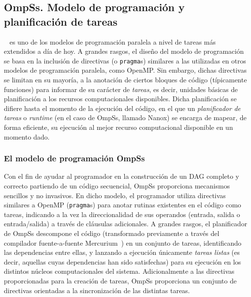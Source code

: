 %
%
%
%

\subsection{OmpSs. Modelo de programación y planificación de tareas}

\ompss~\cite{ompssweb,ompss} es uno de los modelos de programación paralela a nivel de tareas más
extendidos a día de hoy. A grandes rasgos, el diseño del modelo de
programación se basa en la inclusión de directivas (o {\tt pragma}s)
similares a las utilizadas en otros modelos de programación paralela, como
OpenMP. Sin embargo, dichas directivas se limitan en su mayoría, a la
anotación de ciertos bloques de código (típicamente funciones) para
informar de su carácter de {\em tareas}, es decir, unidades básicas de
planificación a los recursos computacionales disponibles. Dicha
planificación se difiere hasta el momento de la ejecución del código, en el
que un {\em planificador de tareas} o {\em runtime} (en el caso de OmpSs,
llamado Nanox) se encarga de mapear, de forma eficiente, su ejecución al
mejor recurso computacional disponible en un momento dado.

\subsubsection{El modelo de programación OmpSs}

Con el fin de ayudar al programador en la construcción de un DAG completo y
correcto partiendo de un código secuencial, OmpSs proporciona mecanismos
sencillos y no invasivos. En dicho modelo, el programador utiliza
directivas similares a OpenMP ({\tt pragma}s) para anotar rutinas
existentes en el código como tareas, indicando a la vez la direccionalidad
de sus operandos (entrada, salida o entrada/salida) a través de cláusulas
adicionales. A grandes rasgos, el planificador de OmpSs descompone el
código (transformado previamente a través del compilador fuente-a-fuente
Mercurium~\cite{Mercurium}) en un conjunto de tareas, identificando las
dependencias entre ellas, y lanzando a ejecución únicamente {\em tareas
  listas} (es decir, aquellas cuyas dependencias han sido satisfechas) para
su ejecución en los distintos núcleos computacionales del
sistema. Adicionalmente a las directivas proporcionadas para la creación de
tareas, OmpSs proporciona un conjunto de directivas orientadas a la
sincronización de las distintas tareas.

